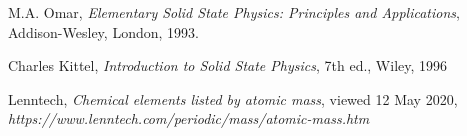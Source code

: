 \begin{thebibliography}{9}
    M.A. Omar, \textit{Elementary Solid State Physics:  
    Principles and Applications}, 
    Addison-Wesley, London, 1993.
    
    Charles Kittel, \textit{Introduction to Solid State Physics}, 7th ed.,
    Wiley, 1996

    Lenntech, \textit{Chemical elements listed by atomic mass}, viewed 12 May 2020,
    \textit{https://www.lenntech.com/periodic/mass/atomic-mass.htm}

\end{thebibliography}